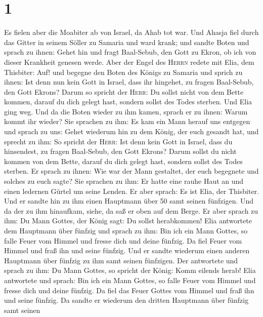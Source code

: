 \hypertarget{section}{%
\section{1}\label{section}}

 Es fielen aber die Moabiter ab von Israel, da Ahab tot
war.  Und Ahasja fiel durch das Gitter in seinem Söller zu
Samaria und ward krank; und sandte Boten und sprach zu ihnen: Gehet hin
und fragt Baal-Sebub, den Gott zu Ekron, ob ich von dieser Krankheit
genesen werde.  Aber der Engel des \textsc{Herrn} redete
mit Elia, dem Thisbiter: Auf! und begegne den Boten des Königs zu
Samaria und sprich zu ihnen: Ist denn nun kein Gott in Israel, dass ihr
hingehet, zu fragen Baal-Sebub, den Gott Ekrons?  Darum so
spricht der \textsc{Herr}: Du sollst nicht von dem Bette kommen, darauf
du dich gelegt hast, sondern sollst des Todes sterben. Und Elia ging
weg.  Und da die Boten wieder zu ihm kamen, sprach er zu
ihnen: Warum kommt ihr wieder?  Sie sprachen zu ihm: Es
kam ein Mann herauf uns entgegen und sprach zu uns: Gehet wiederum hin
zu dem König, der euch gesandt hat, und sprecht zu ihm: So spricht der
\textsc{Herr}: Ist denn kein Gott in Israel, dass du hinsendest, zu
fragen Baal-Sebub, den Gott Ekrons? Darum sollst du nicht kommen von dem
Bette, darauf du dich gelegt hast, sondern sollst des Todes sterben.
 Er sprach zu ihnen: Wie war der Mann gestaltet, der euch
begegnete und solches zu euch sagte?  Sie sprachen zu ihm:
Er hatte eine rauhe Haut an und einen ledernen Gürtel um seine Lenden.
Er aber sprach: Es ist Elia, der Thisbiter.  Und er sandte
hin zu ihm einen Hauptmann über 50 samt seinen fünfzigen. Und da der zu
ihm hinaufkam, siehe, da saß er oben auf dem Berge. Er aber sprach zu
ihm: Du Mann Gottes, der König sagt: Du sollst herabkommen!
 Elia antwortete dem Hauptmann über fünfzig und sprach zu
ihm: Bin ich ein Mann Gottes, so falle Feuer vom Himmel und fresse dich
und deine fünfzig. Da fiel Feuer vom Himmel und fraß ihn und seine
fünfzig.  Und er sandte wiederum einen anderen Hauptmann
über fünfzig zu ihm samt seinen fünfzigen. Der antwortete und sprach zu
ihm: Du Mann Gottes, so spricht der König: Komm eilends herab!
 Elia antwortete und sprach: Bin ich ein Mann Gottes, so
falle Feuer vom Himmel und fresse dich und deine fünfzig. Da fiel das
Feuer Gottes vom Himmel und fraß ihn und seine fünfzig. 
Da sandte er wiederum den dritten Hauptmann über fünfzig samt seinen
